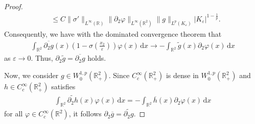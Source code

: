 \documentclass[10pt,a4paper]{amsart}
\newcommand{\bbR}{\mathbb R}
\newcommand{\rd}{\partial}
\newcommand{\ud}{\mathrm{d}}
\begin{document}
\begin{proof}
\begin{equation}
\begin{aligned}
				&\leq C\| \sigma' \|_{L^{\infty}(\bbR)} \| \rd_{2} \varphi \|_{L^{\infty}(\bbR^2)} \| g \|_{L^p(K_{\varepsilon})} |K_{\varepsilon}|^{1-\frac{1}{p}}.
			\end{aligned}
		\end{equation} Consequently, we have with the dominated convergence theorem that \begin{equation*}
			\begin{aligned}
				\int_{\bbR^2} \overline{\partial_2 g}(x) (1-\sigma(\frac{x_2}{\varepsilon})) \varphi(x) \,\ud x \to -\int_{\bbR^2} \widetilde{g}(x) \partial_2 \varphi(x) \,\ud x
			\end{aligned}
		\end{equation*} as $\varepsilon \to 0$. Thus, $\rd_{2} \widetilde{g} = \overline{\rd_{2}g}$ holds.
		
		Now, we consider $g \in W^{1,p}_{0}(\bbR^{2}_{+})$. Since $C^{\infty}_c(\bbR^2_{+})$ is dense in $W^{1,p}_{0}(\bbR^2_{+})$ and $h \in C^{\infty}_c(\bbR^2_{+})$ satisfies \begin{equation*}
			\begin{aligned}
				\int_{\bbR^2} \widetilde{\partial_2 h}(x) \varphi(x) \,\ud x = - \int_{\bbR^2} \overline{h}(x) \partial_2 \varphi(x) \,\ud x
			\end{aligned}
		\end{equation*} for all $\varphi \in C^{\infty}_c(\bbR^2)$, it follows $\partial_2 \overline{g} = \widetilde{\partial_2 g}$.

\end{proof}
\end{document}
